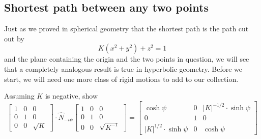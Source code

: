 \documentclass[newpage,hints,,12pt,noauthor,nooutcomes,handout]{ximera}
\begin{document}
\subsection{Shortest path between any two points}

Just as we proved in spherical geometry that the shortest path is the
path cut out by
\[
K(x^{2}+y^{2})+z^{2}=1
\]
and the plane containing the origin and the two points in question, we
will see that a completely analogous result is true in hyperbolic
geometry. Before we start, we will need one more class of rigid
motions to add to our collection.


\begin{problem}
  Assuming $K$ is negative, show
  \[
  \begin{bmatrix}
    1 & 0 & 0 \\
    0 & 1 & 0 \\
    0 & 0 & \sqrt{K}
  \end{bmatrix}
  \cdot 
  \hat N_{-i\psi}
  \begin{bmatrix}
    1 & 0 & 0 \\
    0 & 1 & 0\\
    0 & 0 & \sqrt{K^{-1}}
  \end{bmatrix}
=
  \begin{bmatrix}
    \cosh\psi & 0 & |K|^{-1/2}\cdot\sinh\psi\\
    0 & 1 & 0\\
    |K|^{1/2}\cdot\sinh\psi & 0 & \cosh\psi
  \end{bmatrix}
  \]
\end{problem}
\end{document}
